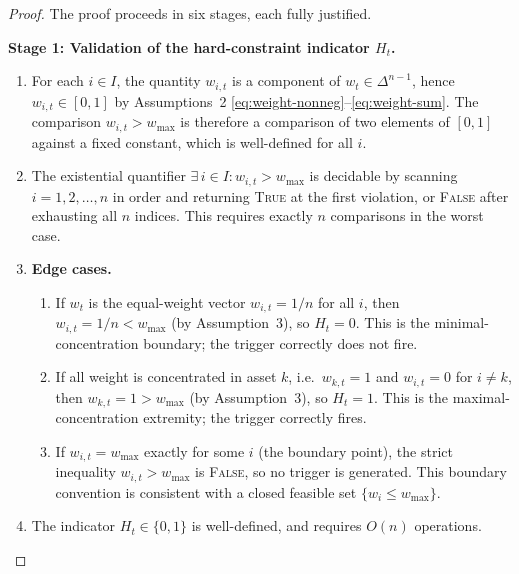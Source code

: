 \documentclass[12pt,openany]{book}
\newcommand{\bfw}{\mathbf{w}}
\numberwithin{equation}{chapter}
\theoremstyle{plain}
\theoremstyle{definition}
\theoremstyle{remark}
\def\mathcal#1{#1}%
\def\bfw{w}%
\begin{document}
\begin{proof}
The proof proceeds in six stages, each fully justified.

\medskip
\noindent\textbf{Stage 1: Validation of the hard-constraint
indicator $H_t$.}
\begin{enumerate}
  \item For each $i \in \mathcal{I}$, the quantity $w_{i,t}$ is a
        component of $\bfw_t \in \Delta^{n-1}$, hence
        $w_{i,t} \in [0, 1]$ by
        Assumptions~2 \eqref{eq:weight-nonneg}--\eqref{eq:weight-sum}.
        The comparison $w_{i,t} > w_{\max}$ is therefore a comparison
        of two elements of $[0,1]$ against a fixed constant, which is
        well-defined for all $i$.

  \item The existential quantifier
        $\exists\, i \in \mathcal{I} : w_{i,t} > w_{\max}$ is decidable
        by scanning $i = 1, 2, \ldots, n$ in order and returning
        \textsc{True} at the first violation, or \textsc{False} after
        exhausting all $n$ indices.  This requires exactly $n$
        comparisons in the worst case.

  \item \textbf{Edge cases.}
        \begin{enumerate}
          \item If $\bfw_t$ is the equal-weight vector
                $w_{i,t} = 1/n$ for all $i$, then $w_{i,t} = 1/n
                < w_{\max}$ (by Assumption~3), so $H_t = 0$.
                This is the minimal-concentration boundary; the
                trigger correctly does not fire.
          \item If all weight is concentrated in asset $k$, i.e.\
                $w_{k,t} = 1$ and $w_{i,t} = 0$ for $i \neq k$,
                then $w_{k,t} = 1 > w_{\max}$ (by Assumption~3),
                so $H_t = 1$.  This is the maximal-concentration
                extremity; the trigger correctly fires.
          \item If $w_{i,t} = w_{\max}$ exactly for some $i$
                (the boundary point), the strict inequality
                $w_{i,t} > w_{\max}$ is \textsc{False}, so no
                trigger is generated.  This boundary convention is
                consistent with a closed feasible set
                $\{w_i \leq w_{\max}\}$.
        \end{enumerate}

  \item The indicator $H_t \in \{0,1\}$ is well-defined,
        and requires $O(n)$ operations.
\end{enumerate}


\end{proof}
\end{document}
